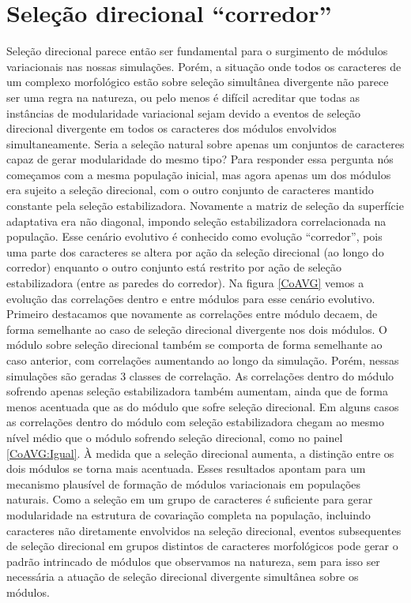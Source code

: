 \section{Seleção direcional ``corredor''}

Seleção direcional parece então ser fundamental para o surgimento de
módulos variacionais nas nossas simulações. 
Porém, a situação onde todos os caracteres de um complexo morfológico estão
sobre seleção simultânea divergente não parece ser uma regra na
natureza, ou pelo menos é difícil acreditar que todas as instâncias de
modularidade variacional sejam devido a eventos de seleção direcional
divergente em todos os caracteres dos módulos envolvidos simultaneamente. 
Seria a seleção natural sobre apenas um conjuntos de caracteres capaz de
gerar modularidade do mesmo tipo?
Para responder essa pergunta nós começamos com a mesma população
inicial, mas agora apenas um dos módulos era sujeito a seleção
direcional, com o outro conjunto de caracteres mantido constante pela
seleção estabilizadora. 
Novamente a matriz de seleção da superfície adaptativa era não diagonal,
impondo seleção estabilizadora correlacionada na população.
Esse cenário evolutivo é conhecido como evolução ``corredor'', pois uma
parte dos caracteres se altera por ação da seleção direcional (ao
longo do corredor) enquanto o outro conjunto está restrito por ação de
seleção estabilizadora (entre as paredes do corredor). 
Na figura \ref{CoAVG} vemos a evolução das correlações dentro e entre
módulos para esse cenário evolutivo. 
Primeiro destacamos que novamente as correlações entre módulo decaem, de
forma semelhante ao caso de seleção direcional divergente nos dois
módulos. 
O módulo sobre seleção direcional também se comporta de forma semelhante
ao caso anterior, com correlações aumentando ao longo da simulação. 
Porém, nessas simulações são geradas 3 classes de correlação. 
As correlações dentro do módulo sofrendo apenas seleção estabilizadora
também aumentam, ainda que de forma menos acentuada que as do módulo que
sofre seleção direcional. 
Em alguns casos as correlações dentro do módulo com seleção
estabilizadora chegam ao mesmo nível médio que o módulo sofrendo seleção
direcional, como no painel \ref{CoAVG:Igual}. 
À medida que a seleção direcional aumenta, a distinção entre os dois
módulos se torna mais acentuada. 
Esses resultados apontam para um mecanismo plausível de formação de
módulos variacionais em populações naturais. 
Como a seleção em um grupo de caracteres é suficiente para gerar
modularidade na estrutura de covariação completa na população, incluindo
caracteres não diretamente envolvidos na seleção direcional, eventos
subsequentes de seleção direcional em grupos distintos de caracteres
morfológicos pode gerar o padrão intrincado de módulos que observamos na
natureza, sem para isso ser necessária a atuação de seleção direcional
divergente simultânea sobre os módulos. 


